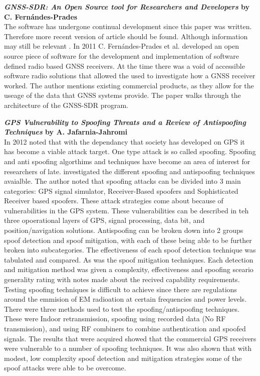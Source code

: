 \medskip

\textbf{\emph{GNSS-SDR: An Open Source tool for Researchers and Developers} by C. Fern\'andes-Prades} \\
The software has undergone continual development since this paper was written. Therefore more recent version of article should be found.
Although information may still be relevant \cite{RN16}.
In 2011 C. Fern\'andes-Prades et al. developed an open source piece of software for the development and implementation of software defined radio based
GNSS receivers. At the time there was a void of accessible software radio solutions that allowed the used to investigate how a GNSS receiver worked.
The author mentions existing commercial products, as they allow for the useage of the data that GNSS systems provide.
The paper walks through the architecture of the GNSS-SDR program.

\medskip

\textbf{\emph{GPS Vulnerability to Spoofing Threats and a Review of Antispoofing Techniques} by A. Jafarnia-Jahromi} \\
In 2012 \textcite{RN6} noted that with the dependancy that society has developed on GPS it has become a viable attack target. One type attack is
so called spoofing. Spoofing and anti spoofing algorthims and techniques have become an area of interest for researchers of late. \citeauthor{RN6}
investigated the different spoofing and antispoofing techniques avaialble. The author noted that spoofing attacks can be divided into 3 main categories:
GPS signal simulator, Receiver-Based spoofers and Sophisticated Receiver based spoofers. These attack strategies come about because of vulnerabilities in the GPS system.
These vulnerabilities can be described in teh three opoerational layers of GPS, signal processing, data bit, and position/navigation solutions.
Antispoofing can be broken down into 2 groups spoof detection and spoof mitigation, with each of these being able to be further broken into subcategories.
The effectiveness of each spoof detection technique was tabulated and compared. As was the spoof mitigation techniques. Each detection and mitigation
method was given a complexity, effectiveness and spoofing sceario generality rating with notes made about the recived capability requirements.
Testing spoofing techniques is difficult to achieve since there are regulations around the emmision of EM radioation at certain frequencies and power levels.
There were three methods used to test the spoofing/antispoofing techniques. These were Indoor retransmission, spoofing using recorded data (No RF transmission), and
using RF combiners to combine authentication and spoofed signals.
The results that were acquired showed that the commercial GPS receivers were vulnerable to a number of spoofing techniques. It was also
shown that with modest, low complexity spoof detection and mitigation strategies some of the spoof attacks were able to be overcome.

